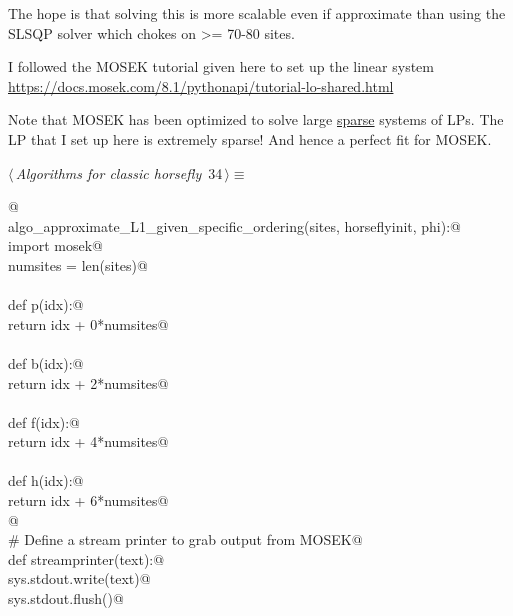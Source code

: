 \documentclass[11.5pt]{report}
\begin{document}
The hope is that solving this is more scalable even if approximate
than using the SLSQP solver which chokes on >= 70-80 sites. 
    
I followed the MOSEK tutorial given here to set up the linear system
\url{https://docs.mosek.com/8.1/pythonapi/tutorial-lo-shared.html}
    
Note that MOSEK has been optimized to solve large \underline{sparse} systems of LPs. 
The LP that I set up here is extremely sparse! And hence a perfect fit 
for MOSEK. 


\begin{flushleft} \small\label{scrap45}\raggedright\small
{} $\langle\,${\itshape Algorithms for classic horsefly}\nobreak\ {\footnotesize {34}}$\,\rangle\equiv$
\vspace{-1ex}
\begin{list}{}{} \item
\mbox{}\verb@ @\\
\mbox{}\verb@def  algo_approximate_L1_given_specific_ordering(sites, horseflyinit, phi):@\\
\mbox{}\verb@    import mosek@\\
\mbox{}\verb@    numsites = len(sites)@\\
\mbox{}\verb@@\\
\mbox{}\verb@    def p(idx):@\\
\mbox{}\verb@        return idx + 0*numsites@\\
\mbox{}\verb@@\\
\mbox{}\verb@    def b(idx):@\\
\mbox{}\verb@        return idx + 2*numsites@\\
\mbox{}\verb@@\\
\mbox{}\verb@    def f(idx):@\\
\mbox{}\verb@        return idx + 4*numsites@\\
\mbox{}\verb@@\\
\mbox{}\verb@    def h(idx):@\\
\mbox{}\verb@        return idx + 6*numsites@\\
\mbox{}\verb@    @\\
\mbox{}\verb@    # Define a stream printer to grab output from MOSEK@\\
\mbox{}\verb@    def streamprinter(text):@\\
\mbox{}\verb@        sys.stdout.write(text)@\\
\mbox{}\verb@        sys.stdout.flush()@\\

\end{list}
\end{flushleft}
\end{document}
